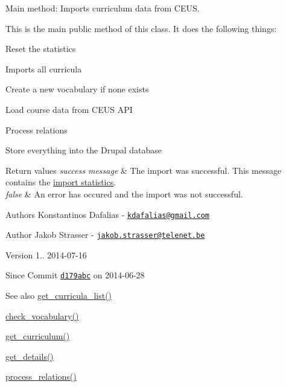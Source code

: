 Main method\+: Imports curriculum data from C\+E\+U\+S. 

This is the main public method of this class. It does the following things\+:
\begin{DoxyEnumerate}
\item Reset the statistics
\item Imports all curricula
\item Create a new vocabulary if none exists
\item Load course data from C\+E\+U\+S A\+P\+I
\item Process relations
\item Store everything into the Drupal database
\end{DoxyEnumerate}


\begin{DoxyRetVals}{Return values}
{\em success message} & The import was successful. This message contains the \hyperlink{classceus__importer_ac383d13daab8093b15c3925f305d8c08}{import statistics}. \\
\hline
{\em false} & An error has occured and the import was not successful.\\
\hline
\end{DoxyRetVals}
\begin{DoxyAuthor}{Authors}
Konstantinos Dafalias -\/ \href{mailto:kdafalias@gmail.com}{\tt kdafalias@gmail.\+com} 
\end{DoxyAuthor}
\begin{DoxyAuthor}{Author}
Jakob Strasser -\/ \href{mailto:jakob.strasser@telenet.be}{\tt jakob.\+strasser@telenet.\+be} 
\end{DoxyAuthor}
\begin{DoxyVersion}{Version}
1.. 2014-\/07-\/16 
\end{DoxyVersion}
\begin{DoxySince}{Since}
Commit \href{http://github.com/TheJake123/DrupalModul/commit/d179abcc5e05743086cd67cf1ce30b08923a7183}{\tt d179abc} on 2014-\/06-\/28
\end{DoxySince}
\begin{DoxySeeAlso}{See also}
\hyperlink{classceus__importer_a16485f39c6678a011ff758e76bf1f458}{get\+\_\+curricula\+\_\+list()} 

\hyperlink{classceus__importer_a5cd89fd2b1560b25eb4300ea6662a1b7}{check\+\_\+vocabulary()} 

\hyperlink{classceus__importer_a0282b9b18ad499198f75d6d81fc82ad0}{get\+\_\+curriculum()} 

\hyperlink{classceus__importer_a404368bea7498901cfdc0fca559089b6}{get\+\_\+details()} 

\hyperlink{classceus__importer_a04b7723caf55a2cfd4b92d02754748dc}{process\+\_\+relations()} 
\end{DoxySeeAlso}


